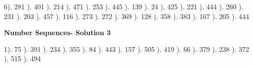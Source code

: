 \documentclass{article}%
\begin{document}
6). 281%
). 401%
). 214%
). 471%
). 253%
). 445%
). 139%
). 24%
). 425%
). 221%
). 444%
). 260%
). 231%
). 203%
). 457%
). 116%
). 273%
). 272%
). 369%
). 128%
). 358%
). 383%
). 167%
). 205%
). 444%
\newline%
\newpage%
\large%
\begin{center}%
\textbf{Number Sequences- Solution 3}%
\newline%
\end{center} \normalsize%
1). 75%
). 391%
). 234%
). 355%
). 84%
). 443%
). 157%
). 505%
). 419%
). 66%
). 379%
). 238%
). 372%
). 515%
). 494%
\newline%
\end{document}
